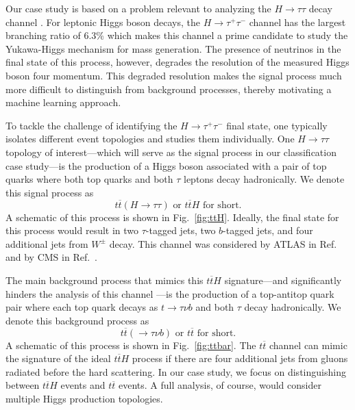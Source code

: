 \documentclass[aps,prd,twocolumn,superscriptaddress,floatfix,longbibliography,preprintnumbers,nofootinbib]{revtex4-1} %
\DeclareRobustCommand{\Fig}[1]{Fig.~\ref{fig:#1}}
\DeclareRobustCommand{\RRef}[1]{Ref.~\cite{#1}}
\newcommand{\neww}[1]{{{#1}}}
\begin{document}
Our case study is based on a problem relevant to analyzing the $H\rightarrow \tau\tau$ decay channel \cite{ATLAS:2018ynr, ATLAS:2020evk, ATLAS:2022yrq}.
%
For leptonic Higgs boson decays, the $H\rightarrow\tau^+\tau^-$ channel has the largest branching ratio of 6.3\% \cite{Djouadi:1997yw,LHCHiggsCrossSectionWorkingGroup:2016ypw} which makes this channel a prime candidate to study the Yukawa-Higgs mechanism for mass generation.
%
The presence of neutrinos in the final state of this process, however, degrades the resolution of the measured Higgs boson four momentum.
%
\neww{This degraded resolution makes the signal process much more difficult to distinguish from background processes, thereby motivating a machine learning approach.}


To tackle the challenge of identifying the $H\rightarrow\tau^+\tau^-$ final state, one typically isolates different event topologies and studies them individually. 
%
One $H\rightarrow\tau\tau$ topology of interest---which will serve as the signal process in our classification case study---is the production of a Higgs boson associated with a pair of top quarks where both top quarks and both $\tau$ leptons decay hadronically.
%
We denote this signal process as 
%
\begin{equation}
  t\overline{t}(H\rightarrow\tau\tau)\textrm{ or }t\overline{t}H \textrm{ for short.}
\end{equation}
%
A schematic of this process is shown in \Fig{ttH}.
%
Ideally, the final state for this process would result in two {\color{c3}$\tau$-tagged jets}, two {\color{c2}$b$-tagged jets}, and four {\color{c1}additional jets from \(W^\pm\) decay}.
%
This channel was considered by ATLAS in \RRef{ATLAS:2022yrq} and by CMS in \RRef{CMS:2020mpn}. 



The main background process that mimics this $t\overline{t}H$ signature---and significantly hinders the analysis of this channel \cite{ATLAS:2022yrq}---is the production of a top-antitop quark pair where each top quark decays as $t\rightarrow\tau\nu b$ and both $\tau$ decay hadronically.
%
We denote this background process as 
%
\begin{equation}
  t\overline{t}(\rightarrow\tau\nu b)  \textrm{ or }t\overline{t}\textrm{ for short.}
\end{equation}
%
A schematic of this process is shown in \Fig{ttbar}.
%
The $t\overline{t}$ channel can mimic the signature of the ideal $t\overline{t}H$ process if there are four additional jets from gluons radiated before the hard scattering.
%
In our case study, we focus on distinguishing between $t\overline{t}H$ events and $t\overline{t}$ events.
%
A full analysis, of course, would consider multiple Higgs production topologies.
\end{document}
